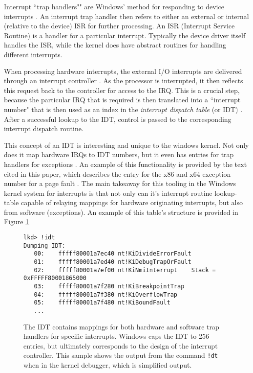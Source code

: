 \par Interrupt ``trap handlers"" are Windows' method for responding to device interrupts \cite{win:1}.
An interrupt trap handler then refers to either an external or internal (relative to the device) ISR for further processing.
An ISR (Interrupt Service Routine) is a handler for a particular interrupt.
Typically the device driver itself handles the ISR, while the kernel does have abstract routines for handling different interrupts.

\par When processing hardware interrupts, the external I/O interrupts are delivered through an interrupt controller \cite{win:1}.
As the processor is interrupted, it then reflects this request back to the controller for access to the IRQ.
This is a crucial step, because the particular IRQ that is required is then translated into a ``interrupt number" that is then used as an index in the \textit{interrupt dispatch table} (or IDT) \cite{win:1}.
After a successful lookup to the IDT, control is passed to the corresponding interrupt dispatch routine.

\par This concept of an IDT is interesting and unique to the windows kernel.
Not only does it map hardware IRQs to IDT numbers, but it even has entries for trap handlers for exceptions \cite{win:1}.
An example of this functionality is provided by the text cited in this paper, which describes the entry for the x86 and x64 exception number for a page fault \cite{win:1}.
The main takeaway for this tooling in the Windows kernel system for interrupts is that not only can it's interrupt routine lookup-table capable of relaying mappings for hardware originating interrupts, but also from software (exceptions).
An example of this table's structure is provided in Figure \ref{code:idt_sample}

\begin{figure}[h]
\begin{lstlisting}
lkd> !idt
Dumping IDT:
   00:    fffff80001a7ec40 nt!KiDivideErrorFault
   01:    fffff80001a7ed40 nt!KiDebugTrapOrFault
   02:    fffff80001a7ef00 nt!KiNmiInterrupt    Stack = 0xFFFFF80001865000
   03:    fffff80001a7f280 nt!KiBreakpointTrap
   04:    fffff80001a7f380 nt!KiOverflowTrap
   05:    fffff80001a7f480 nt!KiBoundFault
   ...
\end{lstlisting}
\centering
\captionsetup{justification=centering}
\caption{
  The IDT contains mappings for both hardware and software trap handlers for specific interrupts.
  Windows caps the IDT to 256 entries, but ultimately corresponds to the design of the interrupt controller.
  This sample shows the output from the command \texttt{!dt} when in the kernel debugger, which is simplified output.
}
\label{code:idt_sample}
\end{figure}

